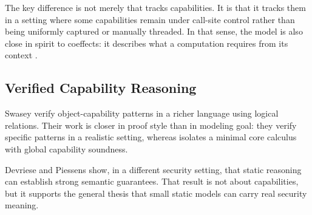 The key difference is not merely that \lambdaCap{} tracks capabilities. %
It is
that it tracks them in a setting where some capabilities remain under
call-site control rather than being uniformly captured or manually threaded. %
In that sense, the model is also close in spirit to coeffects: it describes
what a computation requires from its context \cite{petricek-coeffects}. %

\subsection{Verified Capability Reasoning}

Swasey \etal{} \cite{swasey-caps} verify object-capability patterns in a
richer language using logical relations. %
Their work is closer in proof style
than in modeling goal: they verify specific patterns in a realistic setting,
whereas \lambdaCap{} isolates a minimal core calculus with global capability
soundness. %

Devriese and Piessens \cite{devriese-effect} show, in a different security
setting, that static reasoning can establish strong semantic guarantees. %
That
result is not about capabilities, but it supports the general thesis that
small static models can carry real security meaning. %
